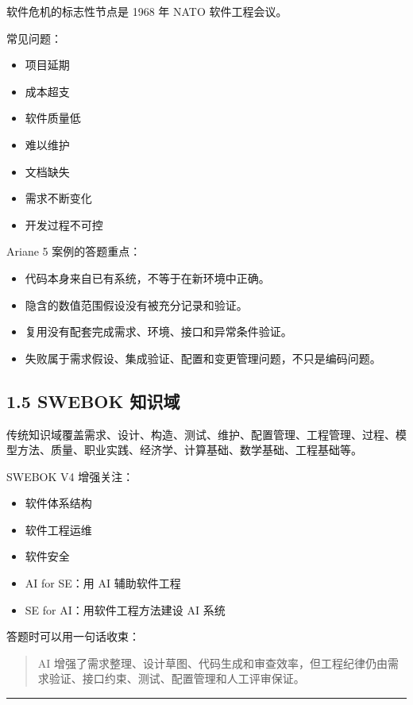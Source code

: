 \documentclass[UTF8,zihao=-4]{ctexart}
\begin{document}
软件危机的标志性节点是 1968 年 NATO 软件工程会议。

常见问题：

\begin{itemize}
\item 项目延期
\item 成本超支
\item 软件质量低
\item 难以维护
\item 文档缺失
\item 需求不断变化
\item 开发过程不可控
\end{itemize}

Ariane 5 案例的答题重点：

\begin{itemize}
\item 代码本身来自已有系统，不等于在新环境中正确。
\item 隐含的数值范围假设没有被充分记录和验证。
\item 复用没有配套完成需求、环境、接口和异常条件验证。
\item 失败属于需求假设、集成验证、配置和变更管理问题，不只是编码问题。
\end{itemize}

\subsection{1.5 SWEBOK 知识域}

传统知识域覆盖需求、设计、构造、测试、维护、配置管理、工程管理、过程、模型方法、质量、职业实践、经济学、计算基础、数学基础、工程基础等。

SWEBOK V4 增强关注：

\begin{itemize}
\item 软件体系结构
\item 软件工程运维
\item 软件安全
\item AI for SE：用 AI 辅助软件工程
\item SE for AI：用软件工程方法建设 AI 系统
\end{itemize}

答题时可以用一句话收束：

\begin{quote}
AI 增强了需求整理、设计草图、代码生成和审查效率，但工程纪律仍由需求验证、接口约束、测试、配置管理和人工评审保证。
\end{quote}

\bigskip\hrule\bigskip
\end{document}
